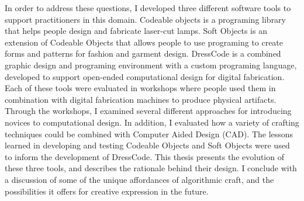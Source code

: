 In order to address these questions,  I developed three different software tools to support practitioners in this domain. Codeable objects is a programing library that helps people design and fabricate laser-cut lamps. Soft Objects is an extension of Codeable Objects that allows people to use programing to create forms and patterns for fashion and garment design. DressCode is a combined graphic design and programing environment with a custom programing language, developed to support open-ended computational design for digital fabrication. Each of these tools were evaluated in workshops where people used them in combination with digital fabrication machines to produce physical artifacts. Through the workshops, I examined several different approaches for introducing novices to computational design. In addition, I evaluated how a variety of crafting techniques could be combined with Computer Aided Design (CAD). The lessons learned in developing and testing Codeable Objects and Soft Objects were used to inform the development of DressCode. This thesis presents the evolution of these three tools, and describes the rationale behind their design. I conclude with a discussion of some of the unique affordances of algorithmic craft, and the possibilities it offers for creative expression in the future. 


